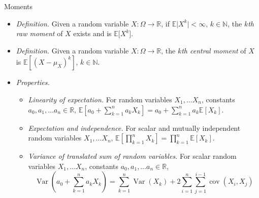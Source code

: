 \documentclass{beamer}
\numberwithin{equation}{section}
\begin{document}
\begin{frame}{Moments}
    \begin{itemize}
        \item
        \textit{Definition.} Given a random variable $ X : \Omega \rightarrow
        \mathbb{R} $, if $ \mathbb{E}\big|X^k\big| < \infty $,
        $ k \in \mathbb{N} $, the $ k $\textit{th raw moment} of $ X $ exists
        \cite{wasserman_stats} and is $ \mathbb{E}\big[X^k\big] $.

        \item
        \textit{Definition.} Given a random variable $ X : \Omega \rightarrow
        \mathbb{R} $, the $ k $\textit{th central moment} of $ X $ is
        $ \mathbb{E}\left[(X - \mu_X)^k\right] $, $ k \in \mathbb{N} $.

         \item
         \textit{Properties.}
         \begin{itemize}
             \item
             \textit{Linearity of expectation.} For random variables
             $ X_1, \ldots X_n $, constants
             $ a_0, a_1, \ldots a_n \in \mathbb{R} $,
             $ \mathbb{E}\left[a_0 + \sum_{k = 1}^na_kX_k\right] =
             a_0 + \sum_{k = 1}^na_k\mathbb{E}[X_k] $.

            \item
            \textit{Expectation and independence.} For scalar and mutually
            independent random variables $ X_1, \ldots X_n $,
            $ \mathbb{E}\left[\prod_{k = 1}^nX_k\right] =
            \prod_{k = 1}^n\mathbb{E}[X_k] $.

            \item
            \textit{Variance of translated sum of random variables.} For scalar random
            variables $ X_1, \ldots X_n $, constants
            $ a_0, a_1, \ldots a_n \in \mathbb{R} $,
            \begin{equation*}
                \operatorname{Var}\left(a_0 + \sum_{k = 1}^na_kX_k\right) =
                \sum_{k = 1}^n\operatorname{Var}(X_k) +
                2\sum_{i = 1}^n\sum_{j = 1}^{i - 1}\operatorname{cov}(X_i, X_j)
            \end{equation*}
         \end{itemize}
    \end{itemize}
\end{frame}
\end{document}
